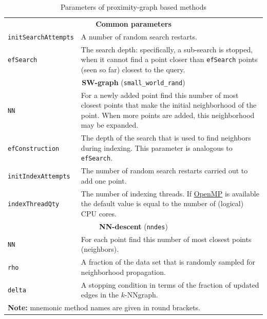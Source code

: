 \documentclass[runningheads,a4paper]{llncs}
\newcommand{\ttt}[1]{\texttt{#1}}
\newcommand{\knnns}{$k$-NN}
\begin{document}
\begin{table}
\caption{Parameters of proximity-graph based methods\label{TableProxGraphs}}
\centering
\begin{tabular}{l@{\hspace{2mm}}p{3.5in}}
\toprule
\multicolumn{2}{c}{\textbf{Common parameters}}\\
\cmidrule(l){1-2} 
\ttt{initSearchAttempts}  & A number of random search restarts. \\
\ttt{efSearch}            & The search depth: specifically, a sub-search is stopped,
                            when it cannot find a point closer than \ttt{efSearch}
                            points (seen so far) closest to the query.
\\
\cmidrule(l){1-2} 
\multicolumn{2}{c}{\textbf{SW-graph} (\ttt{small\_world\_rand}) \cite{malkov2012scalable,malkov2014}  }\\
\cmidrule(l){1-2} 
\ttt{NN}                  & For a newly added point find this number of most closest points
                            that make the initial neighborhood of the point. When more points are added,
                            this neighborhood may be expanded. \\
\ttt{efConstruction}      & The depth of the search that is used to find neighbors during indexing.
                            This parameter is analogous to \ttt{efSearch}.\\
\ttt{initIndexAttempts}   & The number of random search restarts carried out to add one point.\\
\ttt{indexThreadQty}      & The number of indexing threads. If \href{http://openmp.org/wp/}{OpenMP}  is available the default value is
                            equal to the number of (logical) CPU cores. \\
\cmidrule(l){1-2} 
\multicolumn{2}{c}{\textbf{NN-descent} (\ttt{nndes}) \cite{dong2011efficient,malkov2012scalable,malkov2014}  }\\
\cmidrule(l){1-2} 
\ttt{NN}                  & For each point find this number of most closest points (neighbors). \\
\ttt{rho}                 & A fraction of the data set that is randomly sampled for neighborhood propagation.  \\
\ttt{delta}               & A stopping condition in terms of the fraction of updated edges in the \knnns graph. \\
\bottomrule
\multicolumn{2}{l}{\textbf{Note:} mnemonic method names are given in round brackets.}
\end{tabular}
\end{table}
\end{document}
